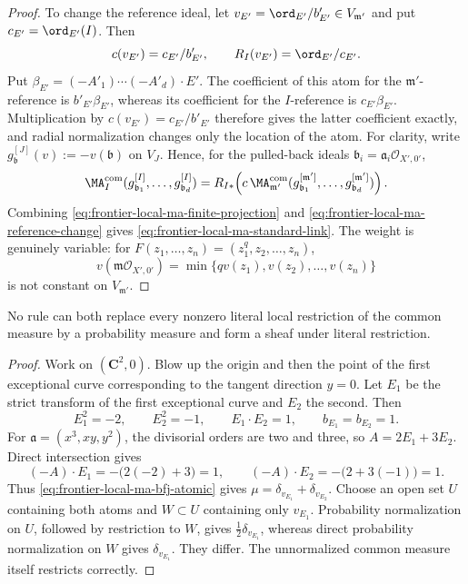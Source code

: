 \begin{proof}
To change the reference ideal, let
\(v_{E'}=\ord_{E'}/b'_{E'}\in V_{\mathfrak m'}\) and put
\(c_{E'}=\ord_{E'}(I)\).  Then
\[
 c(v_{E'})=c_{E'}/b'_{E'},
 \qquad
 R_I(v_{E'})=\ord_{E'}/c_{E'}.
\]
Put
\(\beta_{E'}=(-A'_1)\cdots(-A'_d)\cdot E'\).  The coefficient of this atom
for the \(\mathfrak m'\)-reference is \(b'_{E'}\beta_{E'}\), whereas its
coefficient for the \(I\)-reference is \(c_{E'}\beta_{E'}\).  Multiplication
by \(c(v_{E'})=c_{E'}/b'_{E'}\) therefore gives the latter coefficient
exactly, and radial normalization changes only the location of the atom.
For clarity, write
\(g_{\mathfrak b}^{[J]}(v):=-v(\mathfrak b)\) on \(V_J\).  Hence, for the
pulled-back ideals \(\mathfrak b_i=\mathfrak a_i\mathcal O_{X',0'}\),
\begin{equation}
 \MA^{\mathrm{com}}_I
   (g_{\mathfrak b_1}^{[I]},\ldots,g_{\mathfrak b_d}^{[I]})
 =R_{I*}\!\left(c\,\MA^{\mathrm{com}}_{\mathfrak m'}
   (g_{\mathfrak b_1}^{[\mathfrak m']},\ldots,
    g_{\mathfrak b_d}^{[\mathfrak m']})\right).
 \label{eq:frontier-local-ma-reference-change}
\end{equation}
Combining \eqref{eq:frontier-local-ma-finite-projection} and
\eqref{eq:frontier-local-ma-reference-change} gives
\eqref{eq:frontier-local-ma-standard-link}.  The weight is genuinely
variable: for
\(F(z_1,\ldots,z_n)=(z_1^q,z_2,\ldots,z_n)\),
\[
 v(\mathfrak m\mathcal O_{X',0'})
   =\min\{qv(z_1),v(z_2),\ldots,v(z_n)\}
\]
is not constant on \(V_{\mathfrak m'}\).
\end{proof}

\begin{proposition}\label{prop:frontier-local-ma-no-probability}
No rule can both replace every nonzero literal local restriction of the
common measure by a probability measure and form a sheaf under literal
restriction.
\end{proposition}

\begin{proof}
Work on \((\mathbf C^2,0)\).  Blow up the origin and then the point of the
first exceptional curve corresponding to the tangent direction \(y=0\).
Let \(E_1\) be the strict transform of the first exceptional curve and
\(E_2\) the second.  Then
\[
 E_1^2=-2,\qquad E_2^2=-1,\qquad E_1\cdot E_2=1,
 \qquad b_{E_1}=b_{E_2}=1.
\]
For \(\mathfrak a=(x^3,xy,y^2)\), the divisorial orders are two and three,
so \(A=2E_1+3E_2\).  Direct intersection gives
\[
 (-A)\cdot E_1=-\bigl(2(-2)+3\bigr)=1,
 \qquad
 (-A)\cdot E_2=-\bigl(2+3(-1)\bigr)=1.
\]
Thus \eqref{eq:frontier-local-ma-bfj-atomic} gives
\(\mu=\delta_{v_{E_1}}+\delta_{v_{E_2}}\).  Choose an open set \(U\)
containing both atoms and \(W\subset U\) containing only \(v_{E_1}\).
Probability normalization on \(U\), followed by restriction to \(W\), gives
\(\tfrac12\delta_{v_{E_1}}\), whereas direct probability normalization on
\(W\) gives \(\delta_{v_{E_1}}\).  They differ.  The unnormalized common
measure itself restricts correctly.
\end{proof}


